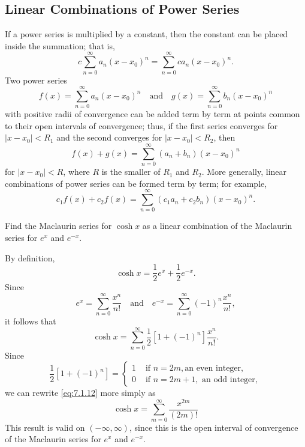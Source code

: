 \documentclass{ximera}
\begin{document}
\subsection*{Linear Combinations of Power Series}

If a power series is multiplied by a constant, then the constant can be
placed inside the summation; that is,
$$
c\sum_{n=0}^\infty a_n(x-x_0)^n=\sum_{n=0}^\infty ca_n(x-x_0)^n.
$$
Two power series
$$
f(x)=\sum_{n=0}^\infty a_n(x-x_0)^n\quad\mbox{and}\quad
g(x)=\sum_{n=0}^\infty b_n(x-x_0)^n
$$
with positive radii of convergence can be added term by term at points
common to their open intervals of convergence;   thus, if the first
series converges for $|x-x_0|<R_1$ and the second converges for
$|x-x_0|<R_2$, then
$$
f(x)+g(x)=\sum_{n=0}^\infty(a_n+b_n)(x-x_0)^n
$$
for $|x-x_0|<R$, where $R$ is the smaller of $R_1$ and $R_2$.
More generally, linear combinations of power series can be formed term
by term;   for example,
$$
c_1f(x)+c_2f(x)=\sum_{n=0}^\infty(c_1a_n+c_2b_n)(x-x_0)^n.
$$

\begin{example}\label{example:7.1.5}
Find the Maclaurin series for $\cosh x$  as a linear
combination of the Maclaurin series for $e^x$ and $e^{-x}$.

\begin{explanation}
By definition,
$$
\cosh x=\frac{1}{2}e^x+\frac{1}{2}e^{-x}.
$$
Since
$$ e^x=\sum_{n=0}^\infty  \frac{x^n}{n!}\quad\mbox{and}\quad
 e^{-x}=\sum_{n=0}^\infty (-1)^n \frac{x^n}{n!},
$$
it follows that
\begin{equation} \label{eq:7.1.12}
\cosh x=\sum_{n=0}^\infty \frac{1}{2}[1+(-1)^n]\frac{x^n}{n!}.
\end{equation}
Since
$$
\frac{1}{2}[1+(-1)^n]=\left\{\begin{array}{cl}1&\mbox{ if } n=2m,\mbox{
an even integer},\\ 0&\mbox{ if }n=2m+1,\mbox{ an odd integer},
\end{array}\right.
$$
we can rewrite \eqref{eq:7.1.12} more simply as
$$
\cosh x=\sum_{m=0}^\infty\frac{x^{2m}}{(2m)!}
$$
This result is valid on $(-\infty,\infty)$, since this is the open
interval of convergence of the Maclaurin series for $e^x$ and
$e^{-x}$.
\end{explanation}
\end{example}
\end{document}
